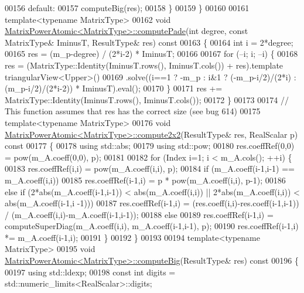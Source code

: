 \begin{DoxyCode}
00156     \textcolor{keywordflow}{default}:
00157       computeBig(res);
00158   \}
00159 \}
00160 
00161 \textcolor{keyword}{template}<\textcolor{keyword}{typename} MatrixType>
00162 \textcolor{keywordtype}{void} \hyperlink{class_eigen_1_1_matrix_power_atomic}{MatrixPowerAtomic<MatrixType>::computePade}(\textcolor{keywordtype}{int} degree, \textcolor{keyword}{const}
       MatrixType& IminusT, ResultType& res)\textcolor{keyword}{ const}
00163 \textcolor{keyword}{}\{
00164   \textcolor{keywordtype}{int} i = 2*degree;
00165   res = (m\_p-degree) / (2*i-2) * IminusT;
00166 
00167   \textcolor{keywordflow}{for} (--i; i; --i) \{
00168     res = (MatrixType::Identity(IminusT.rows(), IminusT.cols()) + res).template triangularView<Upper>()
00169     .solve((i==1 ? -m\_p : i&1 ? (-m\_p-i/2)/(2*i) : (m\_p-i/2)/(2*i-2)) * IminusT).eval();
00170   \}
00171   res += MatrixType::Identity(IminusT.rows(), IminusT.cols());
00172 \}
00173 
00174 \textcolor{comment}{// This function assumes that res has the correct size (see bug 614)}
00175 \textcolor{keyword}{template}<\textcolor{keyword}{typename} MatrixType>
00176 \textcolor{keywordtype}{void} \hyperlink{class_eigen_1_1_matrix_power_atomic}{MatrixPowerAtomic<MatrixType>::compute2x2}(ResultType& res, 
      RealScalar p)\textcolor{keyword}{ const}
00177 \textcolor{keyword}{}\{
00178   \textcolor{keyword}{using} std::abs;
00179   \textcolor{keyword}{using} std::pow;
00180   res.coeffRef(0,0) = pow(m\_A.coeff(0,0), p);
00181 
00182   \textcolor{keywordflow}{for} (Index i=1; i < m\_A.cols(); ++i) \{
00183     res.coeffRef(i,i) = pow(m\_A.coeff(i,i), p);
00184     \textcolor{keywordflow}{if} (m\_A.coeff(i-1,i-1) == m\_A.coeff(i,i))
00185       res.coeffRef(i-1,i) = p * pow(m\_A.coeff(i,i), p-1);
00186     \textcolor{keywordflow}{else} \textcolor{keywordflow}{if} (2*abs(m\_A.coeff(i-1,i-1)) < abs(m\_A.coeff(i,i)) || 2*abs(m\_A.coeff(i,i)) < abs(m\_A.coeff(i-1,i
      -1)))
00187       res.coeffRef(i-1,i) = (res.coeff(i,i)-res.coeff(i-1,i-1)) / (m\_A.coeff(i,i)-m\_A.coeff(i-1,i-1));
00188     \textcolor{keywordflow}{else}
00189       res.coeffRef(i-1,i) = computeSuperDiag(m\_A.coeff(i,i), m\_A.coeff(i-1,i-1), p);
00190     res.coeffRef(i-1,i) *= m\_A.coeff(i-1,i);
00191   \}
00192 \}
00193 
00194 \textcolor{keyword}{template}<\textcolor{keyword}{typename} MatrixType>
00195 \textcolor{keywordtype}{void} \hyperlink{class_eigen_1_1_matrix_power_atomic}{MatrixPowerAtomic<MatrixType>::computeBig}(ResultType& res)\textcolor{keyword}{
       const}
00196 \textcolor{keyword}{}\{
00197   \textcolor{keyword}{using} std::ldexp;
00198   \textcolor{keyword}{const} \textcolor{keywordtype}{int} digits = std::numeric\_limits<RealScalar>::digits;

\end{DoxyCode}
